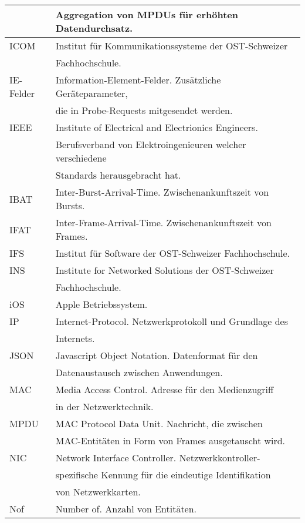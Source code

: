 \begin{longtable}{|l|l|}
    & Aggregation von MPDUs für erhöhten Datendurchsatz. \\
    \hline
    ICOM & Institut für Kommunikationssysteme der OST-Schweizer \\
    & Fachhochschule.\\
    \hline
    IE-Felder & Information-Element-Felder. Zusätzliche Geräteparameter,\\
    & die in Probe-Requests mitgesendet werden. \\
    \hline
    IEEE & Institute of Electrical and Electrionics Engineers. \\
    & Berufsverband von Elektroingenieuren welcher verschiedene \\
    & Standards herausgebracht hat. \\
    \hline
    IBAT & Inter-Burst-Arrival-Time. Zwischenankunftszeit von Bursts. \\
    \hline
    IFAT & Inter-Frame-Arrival-Time. Zwischenankunftszeit von Frames. \\
    \hline
    IFS & Institut für Software der OST-Schweizer Fachhochschule. \\
    \hline
    INS & Institute for Networked Solutions der OST-Schweizer \\
    & Fachhochschule. \\
    \hline
    iOS & Apple Betriebssystem. \\
    \hline
    IP & Internet-Protocol. Netzwerkprotokoll und Grundlage des \\
    & Internets. \\
    \hline
    JSON & Javascript Object Notation. Datenformat für den \\ 
    & Datenaustausch zwischen Anwendungen. \\
    MAC & Media Access Control. Adresse für den Medienzugriff \\
    & in der Netzwerktechnik. \\
    \hline
    MPDU & MAC Protocol Data Unit. Nachricht, die zwischen \\
    & MAC-Entitäten in Form von Frames ausgetauscht wird. \\
    \hline
    NIC & Network Interface Controller. Netzwerkkontroller- \\
    & spezifische Kennung für die eindeutige Identifikation \\ 
    & von Netzwerkkarten. \\
    \hline
    Nof & Number of. Anzahl von Entitäten. \\

\end{longtable}
